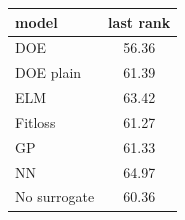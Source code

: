 \begin{tabular}{|lc|}
\hline
model & last rank\\
\hline
DOE & 56.36 \\
DOE plain & 61.39 \\
ELM & 63.42 \\
Fitloss & 61.27 \\
GP & 61.33 \\
NN & 64.97 \\
No surrogate & 60.36 \\
\hline
\end{tabular}
